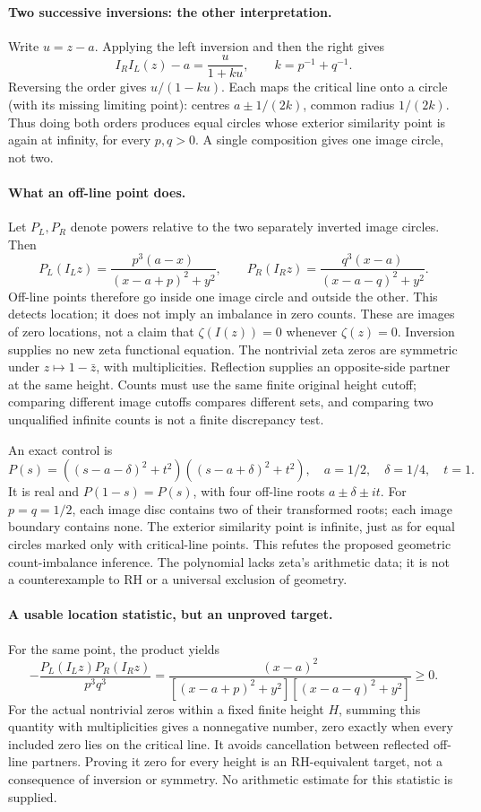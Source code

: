 \paragraph{Two successive inversions: the other interpretation.}
Write $u=z-a$. Applying the left inversion and then the right gives
\[
 I_R I_L(z)-a=\frac{u}{1+ku},\qquad k=p^{-1}+q^{-1}.
\]
Reversing the order gives $u/(1-ku)$. Each maps the critical line
onto a circle (with its missing limiting point): centres $a\pm1/(2k)$,
common radius $1/(2k)$. Thus doing both orders produces equal circles
whose exterior similarity point is again at infinity, for every $p,q>0$.
A single composition gives one image circle, not two.

\paragraph{What an off-line point does.}
Let $P_L,P_R$ denote powers relative to the two separately inverted image
circles. Then
\[
 P_L(I_Lz)=\frac{p^3(a-x)}{(x-a+p)^2+y^2},\qquad
 P_R(I_Rz)=\frac{q^3(x-a)}{(x-a-q)^2+y^2}.
\]
Off-line points therefore go inside one image circle and outside the other.
This detects location; it does not imply an imbalance in zero counts.
These are images of zero locations, not a claim that $\zeta(I(z))=0$
whenever $\zeta(z)=0$. Inversion supplies no new zeta functional equation.
The nontrivial zeta zeros are symmetric under $z\mapsto1-\bar z$,
with multiplicities. Reflection supplies an opposite-side partner at the
same height. Counts must use the same finite original height cutoff;
comparing different image cutoffs compares different sets, and comparing
two unqualified infinite counts is not a finite discrepancy test.

An exact control is
\[
 P(s)=((s-a-\delta)^2+t^2)((s-a+\delta)^2+t^2),\quad
 a=1/2,\quad\delta=1/4,\quad t=1.
\]
It is real and $P(1-s)=P(s)$, with four off-line roots
$a\pm\delta\pm it$. For $p=q=1/2$, each image disc contains two
of their transformed roots; each image boundary contains none. The
exterior similarity point is infinite, just as for equal circles marked
only with critical-line points. This refutes the proposed geometric
count-imbalance inference. The polynomial lacks zeta's arithmetic data;
it is not a counterexample to RH or a universal exclusion of geometry.

\paragraph{A usable location statistic, but an unproved target.}
For the same point, the product yields
\[
 -\frac{P_L(I_Lz)P_R(I_Rz)}{p^3q^3}
 =\frac{(x-a)^2}{[(x-a+p)^2+y^2][(x-a-q)^2+y^2]}\ge0.
\]
For the actual nontrivial zeros within a fixed finite height $H$, summing
this quantity with multiplicities gives a nonnegative number, zero exactly
when every included zero lies on the critical line. It avoids cancellation
between reflected off-line partners. Proving it zero for every height is
an RH-equivalent target, not a consequence of inversion or symmetry.
No arithmetic estimate for this statistic is supplied.

